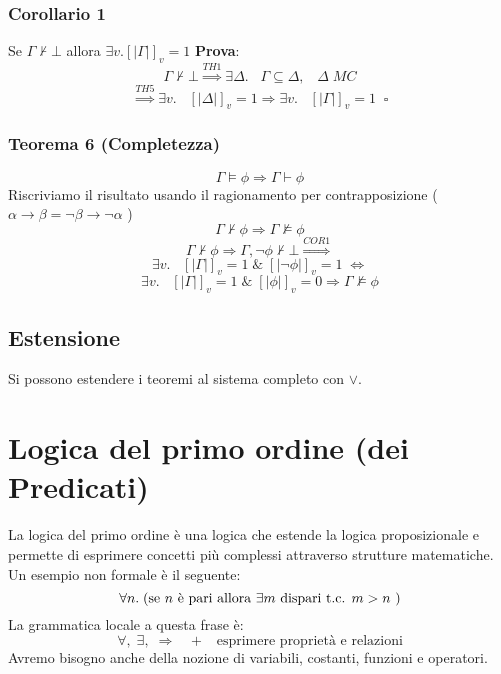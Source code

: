 \documentclass{article}
\theoremstyle{break}
\theoremstyle{break}
\theoremstyle{break}
\theoremstyle{break}
\begin{document}
\subsubsection{Corollario 1}
Se \( \Gamma \not\vdash \bot \) allora \( \exists v. [|\Gamma|]_v=1 \) 
\textbf{Prova}:
\[
  \Gamma \not\vdash \bot \stackrel{TH1}{\Rightarrow} \exists \Delta.\;\;\; \Gamma \subseteq \Delta,\;\;\; \Delta\; MC
\] 
\[
  \stackrel{TH5}{\Rightarrow} \exists v.\;\;\; [|\Delta|]_v=1 \Rightarrow \exists v.\;\;\; [|\Gamma|]_v=1 \;\; \square
\] 
\subsubsection{Teorema 6 (Completezza)}
\[
\Gamma \models \phi \Rightarrow \Gamma \vdash \phi
\] 
Riscriviamo il risultato usando il ragionamento per contrapposizione (\( \alpha \to \beta = \neg \beta \to \neg \alpha \) )
\[
\Gamma \not\vdash \phi \Rightarrow \Gamma \not\models \phi
\] 
\[
  \Gamma \not\vdash \phi \Rightarrow \Gamma,\neg \phi \not\vdash \bot \stackrel{COR1}{\Rightarrow}
\] 
\[
  \exists v.\;\;\; [|\Gamma|]_v=1 \;\&\; [|\neg \phi|]_v=1 \; \Leftrightarrow
\] 
\[
  \exists v.\;\;\; [|\Gamma|]_v=1\; \&\; [|\phi|]_v=0 \Rightarrow \Gamma \not\models \phi
\] 

\subsection{Estensione}
Si possono estendere i teoremi al sistema completo con \( \vee \).

\section{Logica del primo ordine (dei Predicati)}
La logica del primo ordine è una logica che estende la logica proposizionale 
e permette di esprimere concetti più complessi attraverso strutture matematiche.
Un esempio non formale è il seguente:
\[
  \forall n.\; (\text{se \( n \) è pari allora \( \exists m \) dispari t.c. \( m>n \)  })
\] 
La grammatica locale a questa frase è:
\[
  \forall,\; \exists,\; \Rightarrow\;\;\;+\;\;\;\text{esprimere proprietà e relazioni}
\] 
Avremo bisogno anche della nozione di variabili, costanti, funzioni e operatori.
\end{document}
